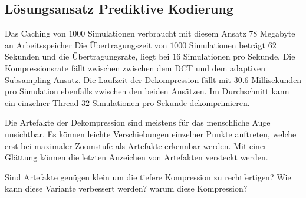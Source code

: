 \subsection{Lösungsansatz Prediktive Kodierung}
Das Caching von $1000$ Simulationen verbraucht mit diesem Ansatz $78$ Megabyte an Arbeitsspeicher Die Übertragungszeit von $1000$ Simulationen beträgt  $62$ Sekunden und die Übertragungsrate, liegt bei $16$ Simulationen pro Sekunde. Die Kompressionsrate fällt zwischen zwischen dem DCT und dem adaptiven Subsampling Ansatz. Die Laufzeit der Dekompression fällt mit $30.6$ Millisekunden pro Simulation ebenfalls zwischen den beiden Ansätzen. Im Durchschnitt kann ein einzelner Thread $32$ Simulationen pro Sekunde dekomprimieren.

Die Artefakte der Dekompression sind meistens für das menschliche Auge unsichtbar. Es können leichte Verschiebungen einzelner Punkte auftreten, welche erst bei maximaler Zoomstufe als Artefakte erkennbar werden. Mit einer Glättung können die letzten Anzeichen von Artefakten versteckt werden. 

Sind Artefakte genügen klein um die tiefere Kompression zu rechtfertigen?  Wie kann diese Variante verbessert werden?
warum diese Kompression?